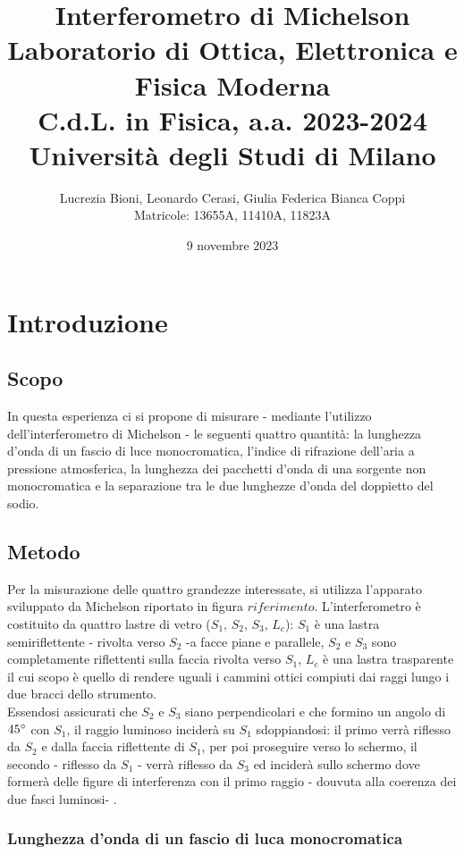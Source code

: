 \documentclass[]{article}
\title{%
    \Huge Interferometro di Michelson \\
    \Large Laboratorio di Ottica, Elettronica e Fisica Moderna \\ C.d.L. in Fisica, a.a. 2023-2024 \\ Università degli Studi di Milano}
\author{\LARGE Lucrezia Bioni, Leonardo Cerasi, Giulia Federica Bianca Coppi \\ Matricole: 13655A, 11410A, 11823A}
\date{9 novembre 2023}
\let\oldsection\section%
\renewcommand{\section}{%
	\renewcommand{\theequation}{\thesection.\arabic{equation}}%
	\oldsection}%
\let\oldsubsection\subsection%
\renewcommand{\subsection}{%
	\renewcommand{\theequation}{\thesubsection.\arabic{equation}}%
	\oldsubsection}%
\begin{document}
\maketitle

\section{Introduzione}

\subsection{Scopo}

In questa esperienza ci si propone di misurare - mediante l'utilizzo dell'interferometro di Michelson - le seguenti quattro quantità: la lunghezza d'onda di un fascio di luce monocromatica, l'indice di rifrazione dell'aria a pressione atmosferica, la lunghezza dei pacchetti d'onda di una sorgente non monocromatica e la separazione tra le due lunghezze d'onda del doppietto del sodio.

\subsection{Metodo}

Per la misurazione delle quattro grandezze interessate, si utilizza l'apparato sviluppato da Michelson riportato in figura $riferimento$. L'interferometro è costituito da quattro lastre di vetro ($S_1, \, S_2, \, S_3, \, L_c$): $S_1$ è una lastra semiriflettente - rivolta verso $S_2$ -a facce piane e parallele, $S_2$ e $S_3$ sono completamente riflettenti sulla faccia rivolta verso $S_1$, $L_c$ è una lastra trasparente il cui scopo è quello di rendere uguali i cammini ottici compiuti dai raggi lungo i due bracci dello strumento. \\ Essendosi assicurati che $S_2$ e $S_3$ siano perpendicolari e che formino un angolo di $45\degree$ con $S_1$, il raggio luminoso inciderà su $S_1$ sdoppiandosi: il primo verrà riflesso da $S_2$ e dalla faccia riflettente di $S_1$, per poi proseguire verso lo schermo, il secondo - riflesso da $S_1$ - verrà riflesso da $S_3$ ed inciderà sullo schermo dove formerà delle figure di interferenza con il primo raggio - douvuta alla coerenza dei due fasci luminosi- .

\subsubsection{Lunghezza d'onda di un fascio di luca monocromatica}
\end{document}
